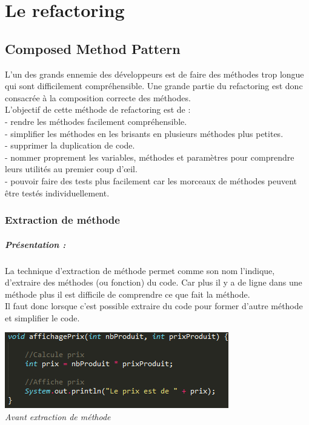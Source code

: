 \documentclass[a4paper,twoside,12pt,openright]{report}
\begin{document}
\chapter{Le refactoring}
\section{Composed Method Pattern}
L'un des grands ennemie des développeurs est de faire des méthodes trop longue qui sont difficilement compréhensible.
Une grande partie du refactoring est donc consacrée à la composition correcte des méthodes.\cite{ref5}\\

L'objectif de cette méthode de refactoring est de :\\
- rendre les méthodes facilement compréhensible.\\
- simplifier les méthodes en les brisants en plusieurs méthodes plus petites.\\
- supprimer la duplication de code.\\
- nommer proprement les variables, méthodes et paramètres pour comprendre leurs utilités au premier coup d'œil.\\
- pouvoir faire des tests plus facilement car les morceaux de méthodes peuvent être testés individuellement.\cite{ref6}\\

\subsection{Extraction de méthode}
\paragraph{Présentation :} 
La technique d'extraction de méthode permet comme son nom l'indique, d'extraire des méthodes (ou fonction) du code. Car plus il y a de ligne dans une méthode plus il est difficile de comprendre ce que fait la méthode.\\
Il faut donc lorsque c'est possible extraire du code pour former d'autre méthode et simplifier le code.
\begin{center}
\includegraphics[scale=1]{Image/Extraction_Methode.png}\\
\itshape{Avant extraction de méthode}
\end{center}
\end{document}

